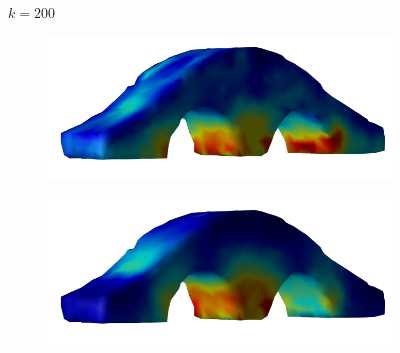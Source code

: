 \documentclass[11pt,titlepage]{article}
\begin{document}
\begin{figure}[!htbp]
\begin{center}
        $k=200$
        \quad
        \begin{subfigure}[b]{0.4\textwidth}
            \centering
            \includegraphics[width=\textwidth]{jacopt_vm/resized/archbridge_tiny_200}
        \end{subfigure}
        \begin{subfigure}[b]{0.4\textwidth}
            \centering
            \includegraphics[width=\textwidth]{soropt_vm/resized/archbridge_tiny_200}
        \end{subfigure}\\ 



\end{center}
\end{figure}
\end{document}
